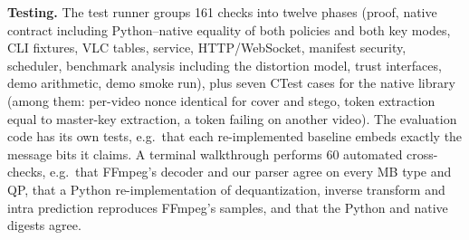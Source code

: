 \textbf{Testing.} The test runner groups 161 checks into twelve phases (proof, native contract including Python--native equality of both policies and both key modes, CLI fixtures, VLC tables, service, HTTP/WebSocket, manifest security, scheduler, benchmark analysis including the distortion model, trust interfaces, demo arithmetic, demo smoke run), plus seven CTest cases for the native library (among them: per-video nonce identical for cover and stego, token extraction equal to master-key extraction, a token failing on another video). The evaluation code has its own tests, e.g.\ that each re-implemented baseline embeds exactly the message bits it claims. A terminal walkthrough performs 60 automated cross-checks, e.g.\ that FFmpeg's decoder and our parser agree on every MB type and QP, that a Python re-implementation of dequantization, inverse transform and intra prediction reproduces FFmpeg's samples, and that the Python and native digests agree.

